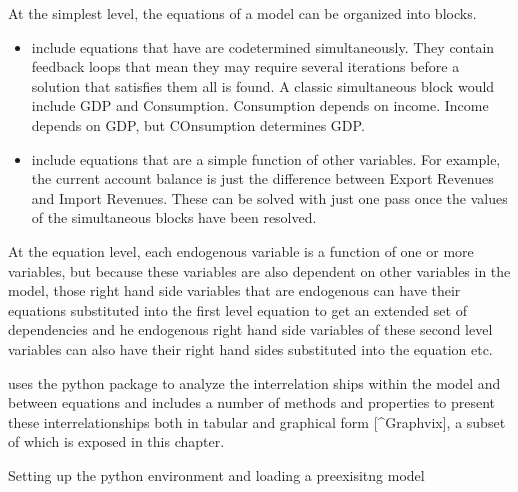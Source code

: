\documentclass[letterpaper,10pt,english]{jupyterBook}
\begin{document}
\sphinxAtStartPar
At the simplest level, the equations of a model can be organized into blocks.
\begin{itemize}
\item {} 
\sphinxAtStartPar
{} include equations that have are co\sphinxhyphen{}determined simultaneously. They contain feedback loops that mean they may require several iterations before a solution that satisfies them all is found. A classic simultaneous block would include GDP and Consumption. Consumption depends on income. Income depends on GDP, but COnsumption determines GDP.

\item {} 
\sphinxAtStartPar
{} include equations that are a simple function of other variables. For example, the current account balance is just the difference between Export Revenues and Import Revenues.  These can be solved with just one pass once the values of the simultaneous blocks have been resolved.

\end{itemize}

\sphinxAtStartPar
At the equation level, each endogenous variable is a function of one or more variables, but because these variables are also dependent on other variables in the model, those right hand side variables that are endogenous can have their equations substituted into the first level equation to get an extended set of dependencies and he endogenous right hand side variables of these second level variables can also have their right hand sides substituted into the equation etc.

\sphinxAtStartPar
{} uses the  python package to analyze the interrelation ships within the model and between equations and includes a number of methods and properties to present these interrelationships both in tabular and graphical form {[}\textasciicircum{}Graphvix{]}, a subset of which is exposed in this chapter.

\sphinxAtStartPar
Setting up the python environment and loading a pre\sphinxhyphen{}exisitng model
\end{document}

